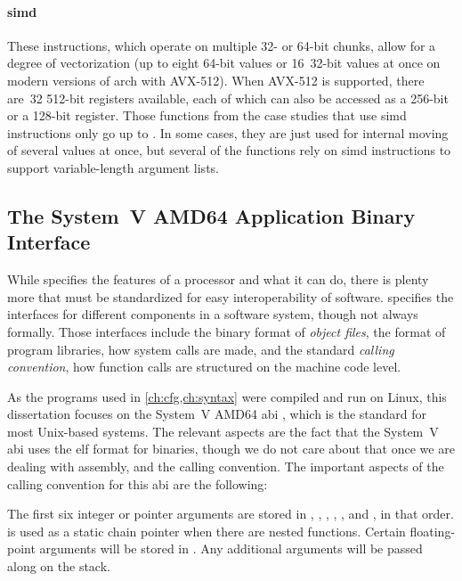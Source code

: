 \paragraph{\Acf{simd}}
These instructions, which operate on multiple 32- or 64-bit chunks,
allow for a degree of vectorization (up to eight 64-bit values
or 16~32-bit values at once on modern versions of \gls{arch} with AVX-512).
When AVX-512 is supported, there are~32 512-bit  registers available,
each of which can also be accessed as a 256-bit 
or a 128-bit  register.
Those functions from the case studies that use \ac{simd} instructions
only go up to . In some cases, they are just used for internal moving
of several values at once, but several of the functions rely on \ac{simd} instructions
to support variable-length argument lists.

\subsection{The System~V AMD64 Application Binary Interface}
While  specifies the features of a processor and what it can do,
there is plenty more that must be standardized for easy interoperability of
software.  specifies the interfaces for different components
in a software system, though not always formally. Those interfaces include
the binary format of \emph{object files}, the format of program libraries,
how system calls are made, and the standard \emph{calling convention},
how function calls are structured on the machine code level.

As the programs used in \cref{ch:cfg,ch:syntax} were compiled and run on Linux,
this dissertation focuses on the System~V AMD64 \ac{abi} \autocite{systemv-ABI-git},
which is the standard for most Unix-based systems.
The relevant aspects are the fact that the System~V \ac{abi} uses the \ac{elf}
format for binaries, though we do not care about that
once we are dealing with assembly, and the calling convention.
The important aspects of the calling convention for this \ac{abi}
are the following:

The first six integer or pointer arguments are stored in ,
, , , ,
and , in that order.
 is used as a static chain pointer when there are nested functions.
Certain floating-point arguments will be stored in
. Any additional arguments will be passed along on the stack.

